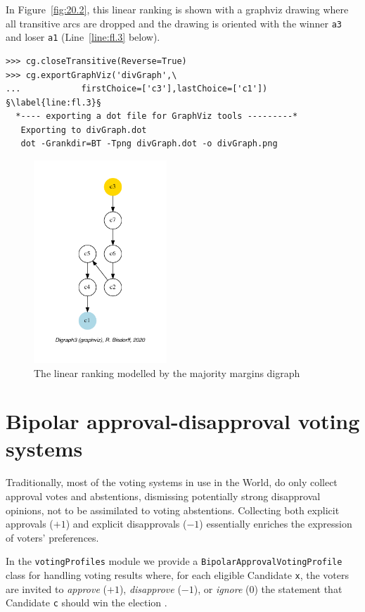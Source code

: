 In Figure~\vref{fig:20.2}, this linear ranking is shown with a graphviz drawing where all transitive arcs are dropped and the drawing is oriented with the \Condorcet winner \texttt{a3} and loser \texttt{a1} (Line~\ref{line:fl.3} below).
\begin{lstlisting}
>>> cg.closeTransitive(Reverse=True)
>>> cg.exportGraphViz('divGraph',\
...            firstChoice=['c3'],lastChoice=['c1']) §\label{line:fl.3}§
  *---- exporting a dot file for GraphViz tools ---------*
   Exporting to divGraph.dot
   dot -Grankdir=BT -Tpng divGraph.dot -o divGraph.png
\end{lstlisting}
\begin{figure}[ht]
\sidecaption[t]
\includegraphics[width=5cm]{Figures/20-2-divGraph.pdf}
\caption{The linear ranking modelled by the majority margins digraph} 
\label{fig:20.2}       %
\end{figure}

\section{Bipolar approval-disapproval voting systems}
\label{sec:20.2}

Traditionally, most of the voting systems in use in the World, do only collect approval votes and abstentions, dismissing potentially strong disapproval opinions, not to be assimilated to voting abstentions. Collecting both explicit approvals ($+1$) and explicit disapprovals ($-1$) essentially enriches the expression of voters' preferences. 

In the \texttt{votingProfiles} module we provide a \texttt{BipolarApprovalVot\-ingProfile} class for handling voting results where, for each eligible Candidate \texttt{x}, the voters are invited  to \emph{approve} ($+1$), \emph{disapprove} ($-1$), or \emph{ignore} ($0$) the statement that Candidate \texttt{c} should win the election \citep{BAU-2012}.

